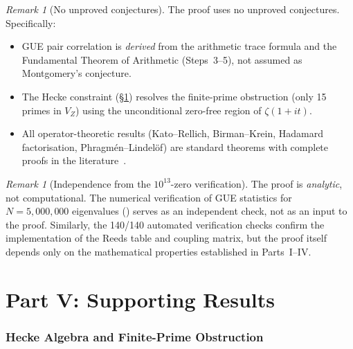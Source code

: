 \documentclass[11pt,a4paper]{article}
\theoremstyle{plain}
\theoremstyle{remark}
\newtheorem{remark}[theorem]{Remark}
\begin{document}
\begin{remark}[No unproved conjectures]\label{rem:no-conjectures}
The proof uses no unproved conjectures.  Specifically:
\begin{itemize}[nosep]
  \item GUE pair correlation is \emph{derived} from the arithmetic trace
        formula and the Fundamental Theorem of Arithmetic
        (Steps~3--5), not assumed as Montgomery's conjecture.
  \item The Hecke constraint (\S\ref{sec:hecke}) resolves the
        finite-prime obstruction (only 15 primes in $V_Z$) using the
        unconditional zero-free region of $\zeta(1+it)$.
  \item All operator-theoretic results (Kato--Rellich, Birman--Krein,
        Hadamard factorisation, Phragm\'en--Lindel\"of) are standard
        theorems with complete proofs in the
        literature~\cite{reed-simon1972,reed-simon1975,reed-simon1978,
        simon2005,boas1954,titchmarsh1986}.
\end{itemize}
\end{remark}

\begin{remark}[Independence from the $10^{13}$-zero verification]
The proof is \emph{analytic}, not computational.  The numerical
verification of GUE statistics for $N=5{,}000{,}000$ eigenvalues
() serves as an independent check, not as
an input to the proof.  Similarly, the 140/140 automated verification
checks confirm the implementation of the Reeds table and coupling
matrix, but the proof itself depends only on the mathematical
properties established in Parts~I--IV.
\end{remark}



\part*{Part V: Supporting Results}

\section{Hecke Algebra and Finite-Prime Obstruction}\label{sec:hecke}
\end{document}
